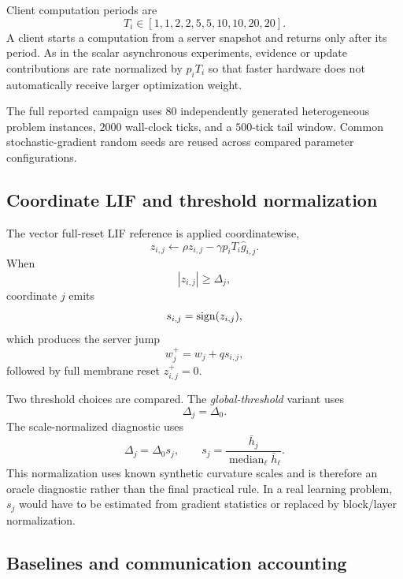 Client computation periods are
\begin{equation}
  T_i\in[1,1,2,2,5,5,10,10,20,20].
\end{equation}
A client starts a computation from a server snapshot and returns only after its period. As in the scalar asynchronous experiments, evidence or update contributions are rate normalized by $p_iT_i$ so that faster hardware does not automatically receive larger optimization weight.

The full reported campaign uses $80$ independently generated heterogeneous problem instances, $2000$ wall-clock ticks, and a $500$-tick tail window. Common stochastic-gradient random seeds are reused across compared parameter configurations.

\subsection{Coordinate LIF and threshold normalization}

The vector full-reset LIF reference is applied coordinatewise,
\begin{equation}
  z_{i,j}\leftarrow \rho z_{i,j}-\gamma p_iT_i\hat g_{i,j}.
\end{equation}
When
\begin{equation}
  |z_{i,j}|\geq\Delta_j,
\end{equation}
coordinate $j$ emits
\begin{equation}
  s_{i,j}=\operatorname{sign}(z_{i,j}),
\end{equation}
which produces the server jump
\begin{equation}
  w_j^+=w_j+q s_{i,j},
\end{equation}
followed by full membrane reset $z_{i,j}^+=0$.

Two threshold choices are compared. The \emph{global-threshold} variant uses
\begin{equation}
  \Delta_j=\Delta_0.
\end{equation}
The scale-normalized diagnostic uses
\begin{equation}
  \Delta_j=\Delta_0 s_j,
  \qquad
  s_j=\frac{\bar h_j}{\operatorname{median}_\ell \bar h_\ell}.
\end{equation}
This normalization uses known synthetic curvature scales and is therefore an oracle diagnostic rather than the final practical rule. In a real learning problem, $s_j$ would have to be estimated from gradient statistics or replaced by block/layer normalization.

\subsection{Baselines and communication accounting}

